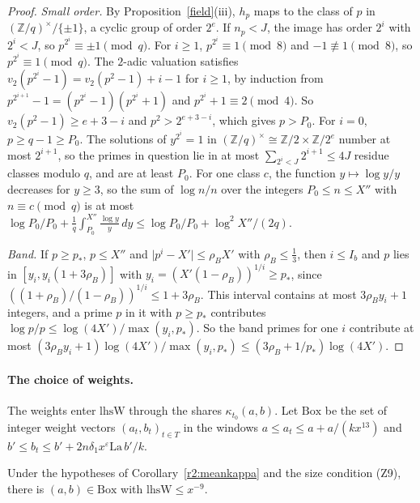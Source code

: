 \begin{proof}
\emph{Small order.} By Proposition~\ref{field}(iii), $h_p$ maps to the class of $p$ in $(\mathbb Z/q)^\times/\{\pm1\}$, a cyclic group of order $2^e$. If $n_p<J$, the image has order $2^i$ with $2^i<J$, so $p^{2^i}\equiv\pm1\pmod q$. For $i\ge1$, $p^{2^i}\equiv1\pmod8$ and $-1\not\equiv1\pmod8$, so $p^{2^i}\equiv1\pmod q$. The $2$-adic valuation satisfies $v_2(p^{2^i}-1)=v_2(p^2-1)+i-1$ for $i\ge1$, by induction from $p^{2^{i+1}}-1=(p^{2^i}-1)(p^{2^i}+1)$ and $p^{2^i}+1\equiv2\pmod4$. So $v_2(p^2-1)\ge e+3-i$ and $p^2>2^{e+3-i}$, which gives $p>P_0$. For $i=0$, $p\ge q-1\ge P_0$. The solutions of $y^{2^i}=1$ in $(\mathbb Z/q)^\times\cong\mathbb Z/2\times\mathbb Z/2^e$ number at most $2^{i+1}$, so the primes in question lie in at most $\sum_{2^i<J}2^{i+1}\le4J$ residue classes modulo $q$, and are at least $P_0$. For one class $c$, the function $y\mapsto\log y/y$ decreases for $y\ge3$, so the sum of $\log n/n$ over the integers $P_0\le n\le X''$ with $n\equiv c\pmod q$ is at most $\log P_0/P_0+\frac1q\int_{P_0}^{X''}\frac{\log y}y\,dy\le\log P_0/P_0+\log^2X''/(2q)$.

\emph{Band.} If $p\ge p_*$, $p\le X''$ and $\lvert p^i-X'\rvert\le\rho_BX'$ with $\rho_B\le\frac13$, then $i\le I_b$ and $p$ lies in $[y_i,y_i(1+3\rho_B)]$ with $y_i=(X'(1-\rho_B))^{1/i}\ge p_*$, since $((1+\rho_B)/(1-\rho_B))^{1/i}\le1+3\rho_B$. This interval contains at most $3\rho_By_i+1$ integers, and a prime $p$ in it with $p\ge p_*$ contributes $\log p/p\le\log(4X')/\max(y_i,p_*)$. So the band primes for one $i$ contribute at most $(3\rho_By_i+1)\log(4X')/\max(y_i,p_*)\le(3\rho_B+1/p_*)\log(4X')$.
\end{proof}

\paragraph{The choice of weights.} The weights enter $\mathrm{lhsW}$ through the shares $\kappa_{t_0}(a,b)$. Let $\mathrm{Box}$ be the set of integer weight vectors $(a_t,b_t)_{t\in T}$ in the windows $a\le a_t\le a+a/(kx^{13})$ and $b'\le b_t\le b'+2n\delta_1x^\varepsilon\mathrm{La}\,b'/k$.

\begin{proposition}\label{r2:weights}
Under the hypotheses of Corollary~\ref{r2:meankappa} and the size condition (Z9), there is $(a,b)\in\mathrm{Box}$ with $\mathrm{lhsW}\le x^{-9}$.
\end{proposition}

